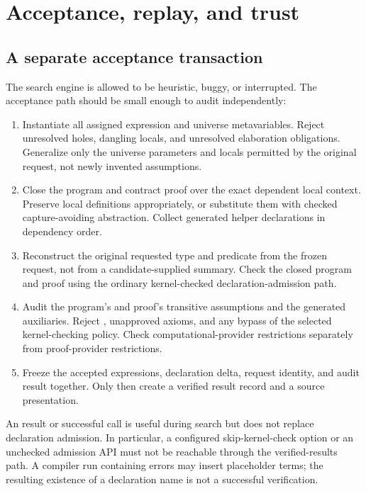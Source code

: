 \section{Acceptance, replay, and trust}\label{sec:acceptance}

\subsection{A separate acceptance transaction}

The search engine is allowed to be heuristic, buggy, or interrupted. The
acceptance path should be small enough to audit independently:
\begin{enumerate}
\item Instantiate all assigned expression and universe metavariables. Reject
unresolved holes, dangling locals, and unresolved elaboration obligations.
Generalize only the universe parameters and locals permitted by the original
request, not newly invented assumptions.
\item Close the program and contract proof over the exact dependent local
context. Preserve local definitions appropriately, or substitute them with
checked capture-avoiding abstraction. Collect generated helper declarations
in dependency order.
\item Reconstruct the original requested type and predicate from the frozen
request, not from a candidate-supplied summary. Check the closed program and
proof using the ordinary kernel-checked declaration-admission path.
\item Audit the program's and proof's transitive assumptions and the generated
auxiliaries. Reject , unapproved axioms, and any bypass of the
selected kernel-checking policy. Check computational-provider restrictions
separately from proof-provider restrictions.
\item Freeze the accepted expressions, declaration delta, request identity,
and audit result together. Only then create a verified result record and a
source presentation.
\end{enumerate}

An  result or successful  call is useful during
search but does not replace declaration admission. In particular, a configured
skip-kernel-check option or an unchecked admission API must not be reachable
through the verified-results path. A compiler run containing errors may insert
placeholder terms; the resulting existence of a declaration name is not a
successful verification.


